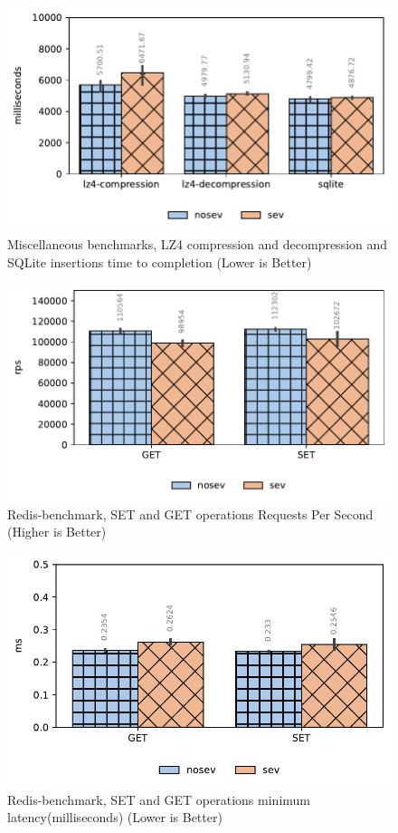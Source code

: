 \documentclass[twocolumn]{article}
\begin{document}
\begin{figure}[ht]
    \centering
    \includegraphics[width=\columnwidth]{img/misc.pdf}
    \caption{Miscellaneous benchmarks, LZ4 compression and decompression and SQLite insertions time to completion (Lower is Better)}
    \label{fig:tb-misc}
\end{figure}

\begin{figure}[ht]
    \centering
    \includegraphics[width=\columnwidth]{img/redis.pdf}
    \caption{Redis-benchmark, SET and GET operations Requests Per Second (Higher is Better)}
    \label{fig:tb-redis}
\end{figure}

\begin{figure}[ht]
    \centering
    \includegraphics[width=\columnwidth]{img/redis-latency.pdf}
    \caption{Redis-benchmark, SET and GET operations minimum latency(milliseconds) (Lower is Better)}
    \label{fig:tb-redis-latency}
\end{figure}
\end{document}
